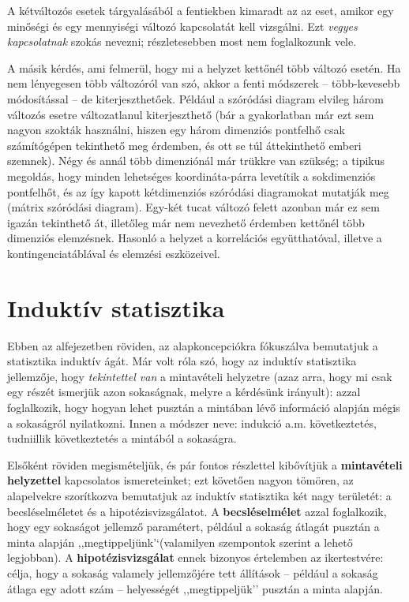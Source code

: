 \documentclass[]{book}
\begin{document}
A kétváltozós esetek tárgyalásából a fentiekben kimaradt az az eset,
amikor egy minőségi és egy mennyiségi változó kapcsolatát kell
vizsgálni. Ezt \emph{vegyes kapcsolatnak} szokás nevezni; részletesebben
most nem foglalkozunk vele.

A másik kérdés, ami felmerül, hogy mi a helyzet kettőnél több változó
esetén. Ha nem lényegesen több változóról van szó, akkor a fenti
módszerek -- több-kevesebb módosítással -- de kiterjeszthetőek. Például
a szóródási diagram elvileg három változós esetre változatlanul
kiterjeszthető (bár a gyakorlatban már ezt sem nagyon szokták használni,
hiszen egy három dimenziós pontfelhő csak számítógépen tekinthető meg
érdemben, és ott se túl áttekinthető emberi szemnek). Négy és annál több
dimenziónál már trükkre van szükség; a tipikus megoldás, hogy minden
lehetséges koordináta-párra levetítik a sokdimenziós pontfelhőt, és az
így kapott kétdimenziós szóródási diagramokat mutatják meg (mátrix
szóródási diagram). Egy-két tucat változó felett azonban már ez sem
igazán tekinthető át, illetőleg már nem nevezhető érdemben kettőnél több
dimenziós elemzésnek. Hasonló a helyzet a korrelációs együtthatóval,
illetve a kontingenciatáblával és elemzési eszközeivel.

\chapter{Induktív statisztika}\label{induktiv}

Ebben az alfejezetben röviden, az alapkoncepciókra fókuszálva bemutatjuk
a statisztika induktív ágát. Már volt róla szó, hogy az induktív
statisztika jellemzője, hogy \emph{tekintettel van} a mintavételi
helyzetre (azaz arra, hogy mi csak egy részét ismerjük azon sokaságnak,
melyre a kérdésünk irányult): azzal foglalkozik, hogy hogyan lehet
pusztán a mintában lévő információ alapján mégis a sokaságról
nyilatkozni. Innen a módszer neve: indukció a.m. következtetés,
tudniillik következtetés a mintából a sokaságra.

Elsőként röviden megismételjük, és pár fontos részlettel kibővítjük a
\textbf{mintavételi helyzettel} kapcsolatos ismereteinket; ezt követően
nagyon tömören, az alapelvekre szorítkozva bemutatjuk az induktív
statisztika két nagy területét: a becsléselméletet és a
hipotézisvizsgálatot. A \textbf{becsléselmélet} azzal foglalkozik, hogy
egy sokaságot jellemző paramétert, például a sokaság átlagát pusztán a
minta alapján ,,megtippeljünk'`(valamilyen szempontok szerint a lehető
legjobban). A \textbf{hipotézisvizsgálat} ennek bizonyos értelemben az
ikertestvére: célja, hogy a sokaság valamely jellemzőjére tett állítások
-- például a sokaság átlaga egy adott szám -- helyességét
,,megtippeljük'' pusztán a minta alapján.
\end{document}
